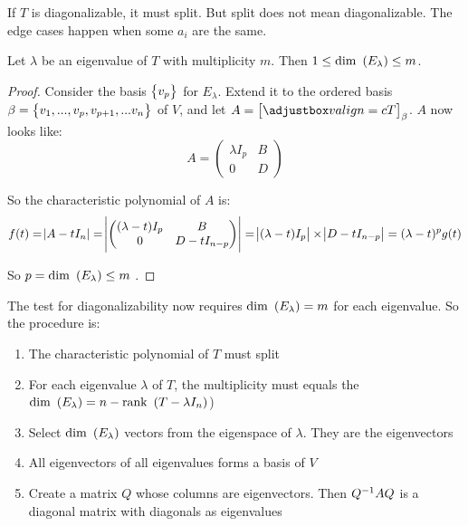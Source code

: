 If $T$ is diagonalizable, it must split. But split does not mean diagonalizable. The edge cases happen when some $a_i$ are the same.


\begin{theorem}
    Let $\lambda$ be an eigenvalue of $T$ with multiplicity $m$. Then $1 \leq \displaystyle \mathrm{dim}~\left( E_\lambda \right) \leq m$.
\end{theorem}
\begin{proof}
    Consider the basis $\set{v_p}$ for $E_\lambda$. Extend it to the ordered basis $\beta = \set{v_1, ..., v_p, v_{p+1}, ... v_n}$ of $V$, and let $A = \coordinate{T}_\beta$. $A$ now looks like:
    \begin{equation*}
        A = \begin{pmatrix}
            \lambda I_p & B \\
            0 & D
        \end{pmatrix}
    \end{equation*}
    
    So the characteristic polynomial of $A$ is:
    \begin{equation*}
        \begin{aligned}
            f(t) = \abs{A - t I_n}  = \abs{\begin{pmatrix}
                (\lambda - t) I_p & B \\
                0 & D - t I_{n-p}
            \end{pmatrix}} = \abs{(\lambda - t) I_p} \times \abs{D - t I_{n-p}}  = (\lambda - t)^p g(t)
        \end{aligned}
    \end{equation*}
    
    So $p= \displaystyle \mathrm{dim}~\left( E_\lambda \right) \leq m$ .
\end{proof}

The test for diagonalizability now requires $\displaystyle \mathrm{dim}~\left( E_\lambda \right) = m$ for each eigenvalue. So the procedure is:
\begin{enumerate}
    \item The characteristic polynomial of $T$ must split
    \item For each eigenvalue $\lambda$ of $T$, the multiplicity must equals the $\displaystyle \mathrm{dim}~\left( E_\lambda \right) = n - \displaystyle \mathrm{rank}~\left( T - \lambda I_n \right)$)
    \item Select $\displaystyle \mathrm{dim}~\left( E_\lambda \right)$ vectors from the eigenspace of $\lambda$. They are the eigenvectors
    \item All eigenvectors of all eigenvalues forms a basis of $V$
    \item Create a matrix $Q$ whose columns are eigenvectors. Then ${Q}^{-1} A Q$ is a diagonal matrix with diagonals as eigenvalues
\end{enumerate}

